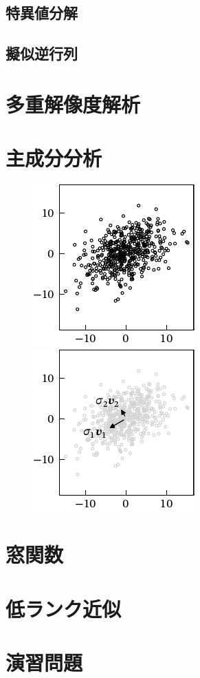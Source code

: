 \documentclass[../../main]{subfiles}
\begin{document}
\subsection{特異値分解}

\subsection{擬似逆行列}

\section{多重解像度解析}

\section{主成分分析}

\begin{figure}[htbp]
  \begin{minipage}{\linewidth/2}
    \centering
    \includegraphics{figures/scatter.pdf}
  \end{minipage}%
  \begin{minipage}{\linewidth/2}
    \centering
    \includegraphics{figures/pca.pdf}
  \end{minipage}
\end{figure}

\begin{subappendices}
\section{窓関数}

\section{低ランク近似}

\end{subappendices}

\section*{演習問題}
\end{document}
